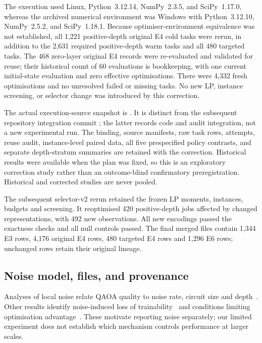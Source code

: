 \documentclass[a4paper,onecolumn,11pt,unpublished]{quantumarticle}
\theoremstyle{remark}
\begin{document}
The execution used Linux, Python~3.12.14, NumPy~2.3.5, and SciPy~1.17.0,
whereas the archived numerical environment was Windows with Python~3.12.10,
NumPy~2.5.2, and SciPy~1.18.1. Because optimiser-environment equivalence
was not established, all 1,221 positive-depth original E4 cold tasks were
rerun, in addition to the 2,631 required positive-depth warm tasks and
all 480 targeted tasks. The 468 zero-layer original E4 records were
re-evaluated and validated for reuse; their historical count of 60 evaluations
is bookkeeping, with one current initial-state evaluation and zero effective
optimisations. There were 4,332 fresh optimisations and no unresolved
failed or missing tasks. No new LP, instance screening, or selector change
was introduced by this correction.

The actual execution-source snapshot is
\texttt{}.
It is distinct from the subsequent repository integration commit
\texttt{};
the latter records code and audit integration, not a new experimental run.
The binding, source manifests, raw task rows, attempts, reuse audit,
instance-level paired data, all five prespecified policy contrasts, and
separate depth-stratum summaries are retained with the correction.
Historical results were available when the plan was fixed, so this is an
exploratory correction study rather than an outcome-blind confirmatory
preregistration. Historical and corrected studies are never pooled.

The subsequent selector-v2 rerun retained the frozen LP moments, instances,
budgets and screening. It reoptimised 420 positive-depth jobs affected by
changed representations, with 492 new observations. All new encodings passed
the exactness checks and all null controls passed. The final merged files contain
1,344 E3 rows, 4,176 original E4 rows, 480 targeted E4 rows and 1,296 E6 rows;
unchanged rows retain their original lineage.

\subsection{Noise model, files, and provenance}
Analyses of local noise relate QAOA quality to noise rate, circuit size
and depth~\cite{Marshall2020}. Other results identify noise-induced
loss of trainability~\cite{WangNoise2021} and conditions limiting
optimisation advantage~\cite{Franca2021}. These motivate reporting
noise separately; our limited experiment does not establish which
mechanism controls performance at larger scales.
\end{document}
